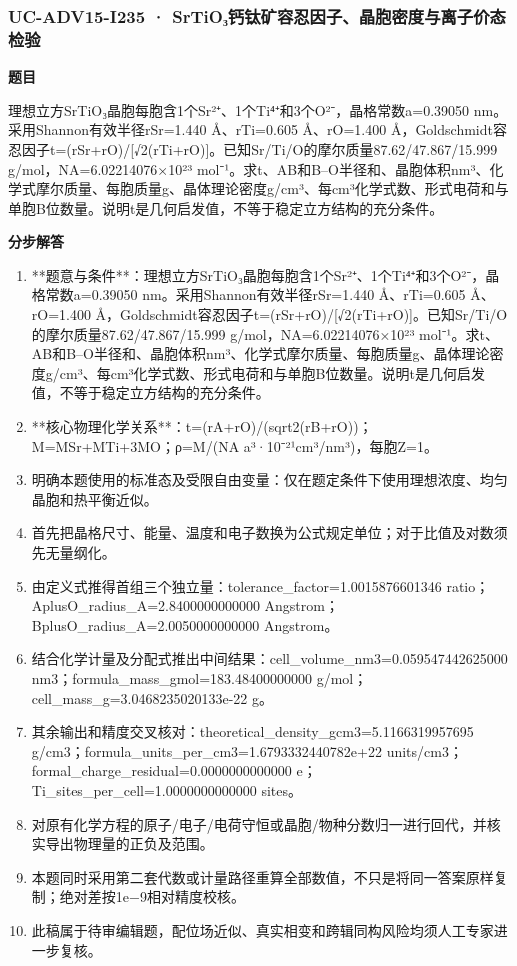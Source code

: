 \documentclass[UTF8,11pt,a4paper]{ctexart}
\begin{document}
\subsubsection*{UC-ADV15-I235 · SrTiO₃钙钛矿容忍因子、晶胞密度与离子价态检验}
\noindent\textbf{题目}\par
理想立方SrTiO₃晶胞每胞含1个Sr²⁺、1个Ti⁴⁺和3个O²⁻，晶格常数a=0.39050 nm。采用Shannon有效半径rSr=1.440 Å、rTi=0.605 Å、rO=1.400 Å，Goldschmidt容忍因子t=(rSr+rO)/[√2(rTi+rO)]。已知Sr/Ti/O的摩尔质量87.62/47.867/15.999 g/mol，NA=6.02214076×10²³ mol⁻¹。求t、AB和B–O半径和、晶胞体积nm³、化学式摩尔质量、每胞质量g、晶体理论密度g/cm³、每cm³化学式数、形式电荷和与单胞B位数量。说明t是几何启发值，不等于稳定立方结构的充分条件。\par
\medskip\noindent\textbf{分步解答}
\begin{enumerate}
\item **题意与条件**：理想立方SrTiO₃晶胞每胞含1个Sr²⁺、1个Ti⁴⁺和3个O²⁻，晶格常数a=0.39050 nm。采用Shannon有效半径rSr=1.440 Å、rTi=0.605 Å、rO=1.400 Å，Goldschmidt容忍因子t=(rSr+rO)/[√2(rTi+rO)]。已知Sr/Ti/O的摩尔质量87.62/47.867/15.999 g/mol，NA=6.02214076×10²³ mol⁻¹。求t、AB和B–O半径和、晶胞体积nm³、化学式摩尔质量、每胞质量g、晶体理论密度g/cm³、每cm³化学式数、形式电荷和与单胞B位数量。说明t是几何启发值，不等于稳定立方结构的充分条件。
\item **核心物理化学关系**：t=(rA+rO)/(sqrt2(rB+rO))；M=MSr+MTi+3MO；ρ=M/(NA a³·10⁻²¹cm³/nm³)，每胞Z=1。
\item 明确本题使用的标准态及受限自由变量：仅在题定条件下使用理想浓度、均匀晶胞和热平衡近似。
\item 首先把晶格尺寸、能量、温度和电子数换为公式规定单位；对于比值及对数须先无量纲化。
\item 由定义式推得首组三个独立量：tolerance\_factor=1.0015876601346 ratio；AplusO\_radius\_A=2.8400000000000 Angstrom；BplusO\_radius\_A=2.0050000000000 Angstrom。
\item 结合化学计量及分配式推出中间结果：cell\_volume\_nm3=0.059547442625000 nm3；formula\_mass\_gmol=183.48400000000 g/mol；cell\_mass\_g=3.0468235020133e-22 g。
\item 其余输出和精度交叉核对：theoretical\_density\_gcm3=5.1166319957695 g/cm3；formula\_units\_per\_cm3=1.6793332440782e+22 units/cm3；formal\_charge\_residual=0.0000000000000 e；Ti\_sites\_per\_cell=1.0000000000000 sites。
\item 对原有化学方程的原子/电子/电荷守恒或晶胞/物种分数归一进行回代，并核实导出物理量的正负及范围。
\item 本题同时采用第二套代数或计量路径重算全部数值，不只是将同一答案原样复制；绝对差按1e−9相对精度校核。
\item 此稿属于待审编辑题，配位场近似、真实相变和跨辑同构风险均须人工专家进一步复核。
\end{enumerate}
\end{document}
